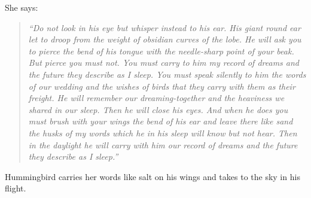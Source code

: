 She says:

\begin{quote}

\textit{``Do not look in his eye but whisper instead to his ear. His giant
round ear let to droop from the weight of obsidian curves of the lobe. He will
ask you to pierce the bend of his tongue with the needle-sharp point of
your beak. But pierce you must not. You must carry to him my record of dreams
and the future they describe as I sleep. You must speak silently to him the
words of our wedding and the wishes of birds that they carry with them as their
freight. He will remember our dreaming-together and the heaviness we shared in
our sleep. Then he will close his eyes. And when he does you must brush with
your wings the bend of his ear and leave there like sand the husks of my words
which he in his sleep will know but not hear. Then in the daylight he will
carry with him our record of dreams and the future they describe as I sleep.''}

\end{quote}

Hummingbird carries her words like salt on his wings and takes to the sky in
his flight.
